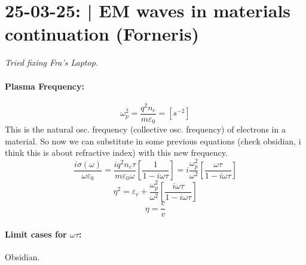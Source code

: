 \section{25-03-25: | EM waves in materials continuation (Forneris)}

\textit{Tried fixing Fra's Laptop.}

\vspace{15pt}

\noindent\paragraph{Plasma Frequency:} 
\begin{equation}
    \omega_p^2 = \frac{q^2 n_c}{m\varepsilon_0} = [s^{-2}]
\end{equation}
This is the natural osc. frequency (collective osc. frequency) of electrons in a material.
So now we can substitute in some previous equations (check obsidian, i think this is about refractive index) with this new frequency.
\begin{equation}
    \frac{i\sigma(\omega)}{\omega\varepsilon_0} = \frac{iq^2n_c\tau}{m\varepsilon_0\omega} \left[\frac{1}{1 - i\omega\tau}\right] = i\frac{\omega^2_p}{\omega^2} \left[\frac{\omega \tau}{1-i\omega\tau}\right] 
\end{equation}
\begin{equation}
    \eta^2 = \varepsilon_r + \frac{\omega^2_p}{\omega^2} \left[\frac{i\omega\tau}{1-i\omega\tau}\right]
\end{equation}
\begin{equation}
    \eta = \frac{c}{v}
\end{equation}

\paragraph{Limit cases for $\omega \tau$:} Obsidian.